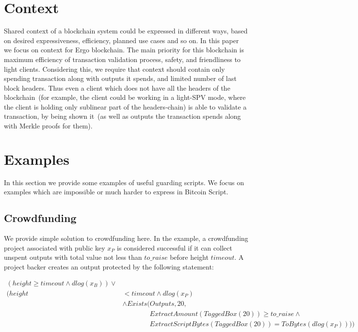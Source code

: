 \documentclass[11pt]{article}
\newcommand{\authnote}[2]{\marginpar{\parbox{\marginparwidth}{\tiny %
  \textsf{#1 {\textcolor{blue}{notes: #2}}}}}%
  \textcolor{blue}{\textbf{\dag}}}
\newcommand{\authnote}[2]{
  \textsf{#1 \textcolor{blue}{: #2}}}
\newcommand{\authnote}[2]{}
\newcommand{\knote}[1]{{\authnote{\textcolor{green}{kushti notes}}{#1}}}
\begin{document}
\section{Context}

Shared context of a blockchain system could be expressed in different ways, based on desired expressiveness, efficiency, planned use cases and so on. In this paper we focus on context for Ergo blockchain. The main priority for this blockchain is maximum efficiency of transaction validation process, safety, and friendliness to light clients. Considering this, we require that context should contain only spending transaction along with outputs it spends, and limited number of last block headers. Thus even a client which does not have all the headers of the blockchain~(for example, the client could be working in a light-SPV mode, where the client is holding only sublinear part of the headers-chain) is able to validate a transaction, by being shown it~(as well as outputs the transaction spends along with Merkle proofs for them).

\knote{brief context description, link to an appendix with details}




\section{Examples}

In this section we provide some examples of useful guarding scripts. We focus on examples which are impossible or much harder to express in Bitcoin Script.

\subsection{Crowdfunding}
\label{sec:crowdfunding}

We provide simple solution to crowdfunding here. In the example, a crowdfunding project associated with public key $x_P$ is considered successful if it can collect unspent outputs with total value not less than $to\_raise$ before height $timeout$. A project backer creates an output protected by the following statement: 

\begin{equation*}
\begin{split}
(height \ge timeout \land dlog(x_B)) \lor \\
(height & < timeout \land dlog(x_P)\\
& \land Exists(Outputs, 20,\\ 
& \quad \quad \quad \quad ExtractAmount(TaggedBox(20)) \ge to\_raise \land \\ 
& \quad \quad \quad \quad ExtractScriptBytes(TaggedBox(20)) = ToBytes(dlog(x_P))))
\end{split}
\end{equation*}
\end{document}
